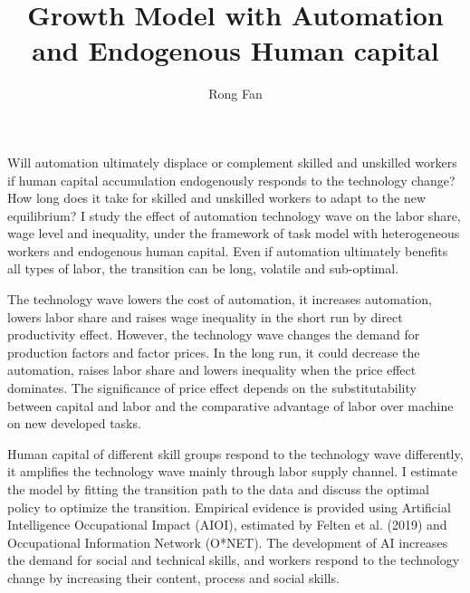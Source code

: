 \documentclass[12pt]{article}
\title{Growth Model with Automation and Endogenous Human capital}
\date{}
\author{Rong Fan}
\begin{document}
\maketitle
Will automation ultimately displace or complement skilled and unskilled workers if human capital accumulation endogenously responds to the technology change? How long does it take for skilled and unskilled workers to adapt to the new equilibrium? I study the effect of automation technology wave on the labor share, wage level and inequality, under the framework of task model with heterogeneous workers and endogenous human capital. Even if automation ultimately benefits all types of labor, the transition can be long, volatile and sub-optimal. 

The technology wave lowers the cost of automation, it increases automation, lowers labor share and raises wage inequality in the short run by direct productivity effect. However, the technology wave changes the demand for production factors and factor prices. In the long run, it could decrease the automation, raises labor share and lowers inequality when the price effect dominates. The significance of price effect depends on the substitutability between capital and labor and the comparative advantage of labor over machine on new developed tasks. 

Human capital of different skill groups respond to the technology wave differently, it amplifies the technology wave mainly through labor supply channel. I estimate the model by fitting the transition path to the data and discuss the optimal policy to optimize the transition. Empirical evidence is provided using Artificial Intelligence Occupational Impact (AIOI), estimated by Felten et al. (2019) and Occupational Information Network (O*NET). The development of AI increases the demand for social and technical skills, and workers respond to the technology change by increasing their content, process and social skills. 
\end{document}
